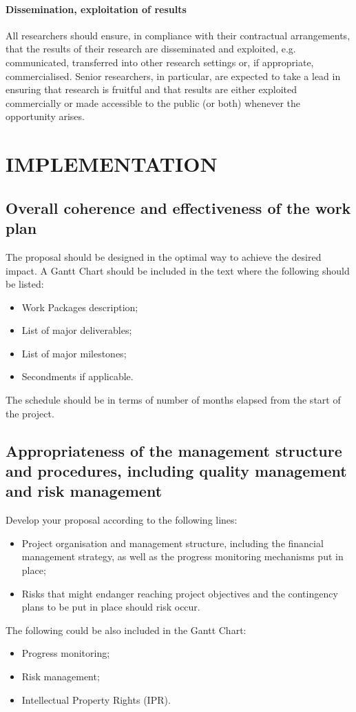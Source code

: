 \documentclass[a4paper,11pt]{article}
\begin{document}
\paragraph{Dissemination, exploitation of results}
All researchers should ensure, in compliance with their contractual arrangements, that the results of their research are disseminated and exploited, e.g. communicated, transferred into other research settings or, if appropriate, commercialised. Senior researchers, in particular, are expected to take a lead in ensuring that research is fruitful and that results are either exploited commercially or made accessible to the public (or both) whenever the opportunity arises. 


\section{IMPLEMENTATION}
\label{sec:implementation}

\subsection{Overall coherence and effectiveness of the work plan}

The proposal should be designed in the optimal way to achieve the desired impact. A Gantt Chart should be included in the text where the following should be listed:
\begin{itemize}
\item Work Packages description; 
\item List of major deliverables;    
\item List of major milestones;  
\item Secondments if applicable.
\end{itemize}

The schedule should be in terms of number of months elapsed from the start of the project.

\subsection{Appropriateness of the management structure and procedures, including quality management and risk management}

Develop your proposal according to the following lines:
\begin{itemize}
\item Project organisation and management structure, including the financial management strategy, as well as the progress monitoring mechanisms put in place;
\item Risks that might endanger reaching project objectives and the contingency plans to be put in place should risk occur.
\end{itemize}
The following could be also included in the Gantt Chart:
\begin{itemize}
\item Progress monitoring;
\item Risk management;
\item Intellectual Property Rights (IPR).
\end{itemize}
\end{document}
